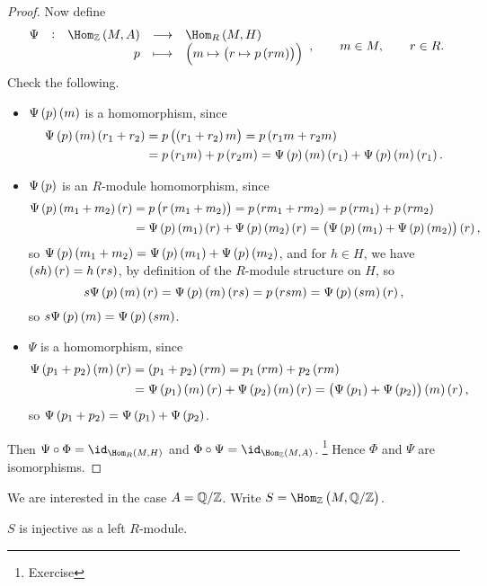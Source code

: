 \begin{proof}
Now define
$$ \function[\Psi]{\Hom_\ZZ\br{M, A}}{\Hom_R\br{M, H}}{p}{\br{m \mapsto \br{r \mapsto p\br{rm}}}}, \qquad m \in M, \qquad r \in R. $$
Check the following.
\begin{itemize}
\item $ \Psi\br{p}\br{m} $ is a homomorphism, since
\begin{align*}
\Psi\br{p}\br{m}\br{r_1 + r_2}
& = p\br{\br{r_1 + r_2}m}
= p\br{r_1m + r_2m} \\
& = p\br{r_1m} + p\br{r_2m}
= \Psi\br{p}\br{m}\br{r_1} + \Psi\br{p}\br{m}\br{r_1}.
\end{align*}
\item $ \Psi\br{p} $ is an $ R $-module homomorphism, since
\begin{align*}
\Psi\br{p}\br{m_1 + m_2}\br{r}
& = p\br{r\br{m_1 + m_2}}
= p\br{rm_1 + rm_2}
= p\br{rm_1} + p\br{rm_2} \\
& = \Psi\br{p}\br{m_1}\br{r} + \Psi\br{p}\br{m_2}\br{r}
= \br{\Psi\br{p}\br{m_1} + \Psi\br{p}\br{m_2}}\br{r},
\end{align*}
so $ \Psi\br{p}\br{m_1 + m_2} = \Psi\br{p}\br{m_1} + \Psi\br{p}\br{m_2} $, and for $ h \in H $, we have $ \br{sh}\br{r} = h\br{rs} $, by definition of the $ R $-module structure on $ H $, so
$$ s\Psi\br{p}\br{m}\br{r} = \Psi\br{p}\br{m}\br{rs} = p\br{rsm} = \Psi\br{p}\br{sm}\br{r}, $$
so $ s\Psi\br{p}\br{m} = \Psi\br{p}\br{sm} $.
\item $ \Psi $ is a homomorphism, since
\begin{align*}
\Psi\br{p_1 + p_2}\br{m}\br{r}
& = \br{p_1 + p_2}\br{rm}
= p_1\br{rm} + p_2\br{rm} \\
& = \Psi\br{p_1}\br{m}\br{r} + \Psi\br{p_2}\br{m}\br{r}
= \br{\Psi\br{p_1} + \Psi\br{p_2}}\br{m}\br{r},
\end{align*}
so $ \Psi\br{p_1 + p_2} = \Psi\br{p_1} + \Psi\br{p_2} $.
\end{itemize}
Then $ \Psi \circ \Phi = \id_{\Hom_R\br{M, H}} $ and $ \Phi \circ \Psi = \id_{\Hom_\ZZ\br{M, A}} $. \footnote{Exercise} Hence $ \Phi $ and $ \Psi $ are isomorphisms.
\end{proof}

We are interested in the case $ A = \mathbb{Q} / \mathbb{Z} $. Write $ S = \Hom_\ZZ\br{M, \QQ / \ZZ} $.


\begin{proposition}
$ S $ is injective as a left $ R $-module.
\end{proposition}

